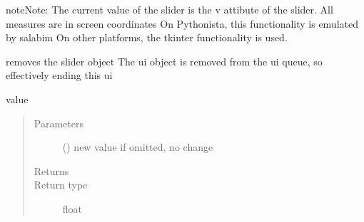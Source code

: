 \documentclass[letterpaper,10pt,english]{sphinxmanual}
\begin{document}
\begin{fulllineitems}
\begin{sphinxadmonition}{note}{Note:}
The current value of the slider is the v attibute of the slider. 
All measures are in screen coordinates 
On Pythonista, this functionality is emulated by salabim
On other platforms, the tkinter functionality is used.
\end{sphinxadmonition}

\begin{fulllineitems}
\label{\detokenize{Reference:salabim.AnimateSlider.remove}}
removes the slider object 
The ui object is removed from the ui queue,
so effectively ending this ui

\end{fulllineitems}


\begin{fulllineitems}
\label{\detokenize{Reference:salabim.AnimateSlider.v}}
value
\begin{quote}\begin{description}
\item[{Parameters}] \leavevmode
{} () \textendash{} new value 
if omitted, no change

\item[{Returns}] \leavevmode
{}

\item[{Return type}] \leavevmode
float

\end{description}\end{quote}

\end{fulllineitems}


\end{fulllineitems}

\end{document}
